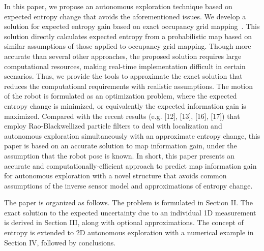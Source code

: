 \documentclass[letterpaper, 10pt, conference]{ieeeconf}
\begin{document}
In this paper, we propose an autonomous exploration technique based on expected entropy change that avoids the aforementioned issues. 
We develop a solution for expected entropy gain based on exact occupancy grid mapping~\cite{KauLeeAiMos16}. This solution directly calculates expected entropy from a probabilistic map based on similar assumptions of those applied to occupancy grid mapping.
Though more accurate than several other approaches, the proposed solution requires large computational resources, making real-time implementation difficult in certain scenarios.
Thus, we provide the tools to approximate the exact solution that reduces the computational requirements with realistic assumptions.
The motion of the robot is formulated as an optimization problem, where the expected entropy change is minimized, or equivalently the expected information gain is maximized.
Compared with the recent results (e.g. [12], [13], [16], [17]) that employ Rao-Blackwellized particle filters to deal with localization and autonomous exploration simultaneously with an approximate entropy change, this paper is based on an accurate solution to map information gain, under the assumption that the robot pose is known. In short, this paper presents an accurate and computationally-efficient approach to predict
map information gain for autonomous exploration with a novel structure that avoids common assumptions of the inverse sensor model and approximations of entropy change.



The paper is organized as follows. The problem is formulated in Section II. The exact solution to the expected uncertainty due to an individual 1D measurement is derived in Section III, along with optional approximations. The concept of entropy is extended to 2D autonomous exploration with a numerical example in Section IV, followed by conclusions.
\end{document}
